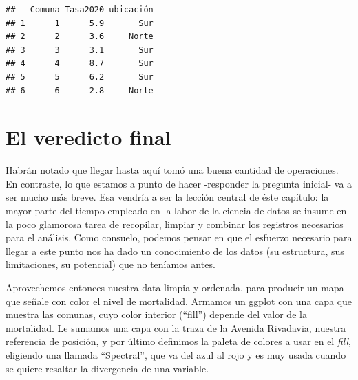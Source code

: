 \documentclass[
]{book}
\newenvironment{Shaded}{\begin{snugshade}}{\end{snugshade}}
\newcommand{\AttributeTok}[1]{\textcolor[rgb]{0.77,0.63,0.00}{#1}}
\newcommand{\FunctionTok}[1]{\textcolor[rgb]{0.00,0.00,0.00}{#1}}
\newcommand{\NormalTok}[1]{#1}
\newcommand{\SpecialCharTok}[1]{\textcolor[rgb]{0.00,0.00,0.00}{#1}}
\newcommand{\StringTok}[1]{\textcolor[rgb]{0.31,0.60,0.02}{#1}}
\begin{document}
\begin{verbatim}
##   Comuna Tasa2020 ubicación
## 1      1      5.9       Sur
## 2      2      3.6     Norte
## 3      3      3.1       Sur
## 4      4      8.7       Sur
## 5      5      6.2       Sur
## 6      6      2.8     Norte
\end{verbatim}

\hypertarget{el-veredicto-final}{%
\section{El veredicto final}\label{el-veredicto-final}}

Habrán notado que llegar hasta aquí tomó una buena cantidad de operaciones. En contraste, lo que estamos a punto de hacer -responder la pregunta inicial- va a ser mucho más breve. Esa vendría a ser la lección central de éste capítulo: la mayor parte del tiempo empleado en la labor de la ciencia de datos se insume en la poco glamorosa tarea de recopilar, limpiar y combinar los registros necesarios para el análisis. Como consuelo, podemos pensar en que el esfuerzo necesario para llegar a este punto nos ha dado un conocimiento de los datos (su estructura, sus limitaciones, su potencial) que no teníamos antes.

Aprovechemos entonces nuestra data limpia y ordenada, para producir un mapa que señale con color el nivel de mortalidad. Armamos un ggplot con una capa que muestra las comunas, cuyo color interior (``fill'') depende del valor de la mortalidad. Le sumamos una capa con la traza de la Avenida Rivadavia, nuestra referencia de posición, y por último definimos la paleta de colores a usar en el \emph{fill}, eligiendo una llamada ``Spectral'', que va del azul al rojo y es muy usada cuando se quiere resaltar la divergencia de una variable.

\begin{Shaded}
\end{Shaded}
\end{document}
